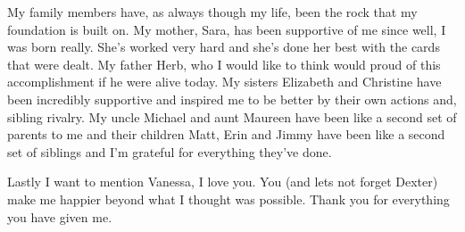 My family members have, as always though my life, been the rock that my foundation is built on. My mother, Sara, has been supportive of me since well, I was born really. She's worked very hard and she's done her best with the cards that were dealt. My father Herb, who I would like to think would proud of this accomplishment if he were alive today. My sisters Elizabeth and Christine have been incredibly supportive and inspired me to be better by their own actions and, sibling rivalry. My uncle Michael and aunt Maureen have been like a second set of parents to me and their children Matt, Erin and Jimmy have been like a second set of siblings and I'm grateful for everything they've done.

Lastly I want to mention Vanessa, I love you. You (and lets not forget Dexter) make me happier beyond what I thought was possible. Thank you for everything you have given me.



\vskip 1in

\noindent
